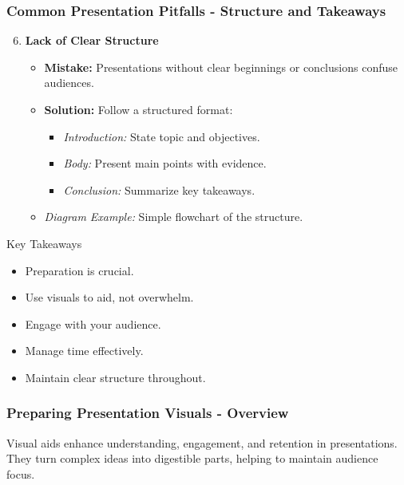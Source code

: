 \documentclass[aspectratio=169]{beamer}
\begin{document}
\begin{frame}[fragile]
    \frametitle{Common Presentation Pitfalls - Structure and Takeaways}
    \begin{enumerate}
        \setcounter{enumi}{5}
        \item \textbf{Lack of Clear Structure}
        \begin{itemize}
            \item \textbf{Mistake:} Presentations without clear beginnings or conclusions confuse audiences.
            \item \textbf{Solution:} Follow a structured format:
            \begin{itemize}
                \item \textit{Introduction:} State topic and objectives.
                \item \textit{Body:} Present main points with evidence.
                \item \textit{Conclusion:} Summarize key takeaways.
            \end{itemize}
            \item \textit{Diagram Example:} Simple flowchart of the structure.
        \end{itemize}
    \end{enumerate}

    \begin{block}{Key Takeaways}
        \begin{itemize}
            \item Preparation is crucial.
            \item Use visuals to aid, not overwhelm.
            \item Engage with your audience.
            \item Manage time effectively.
            \item Maintain clear structure throughout.
        \end{itemize}
    \end{block}
\end{frame}

\begin{frame}[fragile]
    \frametitle{Preparing Presentation Visuals - Overview}
    Visual aids enhance understanding, engagement, and retention in presentations. They turn complex ideas into digestible parts, helping to maintain audience focus.
\end{frame}
\end{document}

